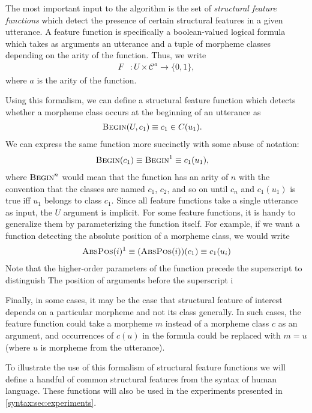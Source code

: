 The most important input to the algorithm is the set of \emph{structural feature functions} which detect the presence of certain structural features in a given utterance.
A feature function is specifically a boolean-valued logical formula which takes as arguments an utterance and a tuple of morpheme classes depending on the arity of the function.
Thus, we write
\begin{align}
  F &: U \times \mathcal C^a \rightarrow \{0,1\}
  ,
\end{align}
where $a$ is the arity of the function.

Using this formalism, we can define a structural feature function which detects whether a morpheme class occurs at the beginning of an utterance as
\begin{align}
  \textsc{Begin}(U, c_1) &\equiv c_1 \in C(u_1)
  .
\end{align}
We can express the same function more succinctly with some abuse of notation:
\begin{align}
  \textsc{Begin}(c_1) \equiv \textsc{Begin}^1 &\equiv c_1(u_1)
  ,
\end{align}
where $\textsc{Begin}^n$ would mean that the function has an arity of $n$ with the convention that the classes are named $c_1$, $c_2$, and so on until $c_n$
  and $c_1(u_1)$ is true iff $u_1$ belongs to class $c_1$.
Since all feature functions take a single utterance as input, the $U$ argument is implicit.
For some feature functions, it is handy to generalize them by parameterizing the function itself.
For example, if we want a function detecting the absolute position of a morpheme class, we would write
\begin{align}
  \textsc{AbsPos}(i)^1 \equiv (\textsc{AbsPos}(i))(c_1) \equiv c_1(u_i)
\end{align}
Note that the higher-order parameters of the function precede the superscript to distinguish The position of arguments before the superscript i

Finally, in some cases, it may be the case that structural feature of interest depends on a particular morpheme and not its class generally.
In such cases, the feature function could take a morpheme $m$ instead of a morpheme class $c$ as an argument, and occurrences of $c(u)$ in the formula could be replaced with $m = u$ (where $u$ is morpheme from the utterance).

To illustrate the use of this formalism of structural feature functions we will define a handful of common structural features from the syntax of human language.
These functions will also be used in the experiments presented in \cref{syntax:sec:experiments}.

